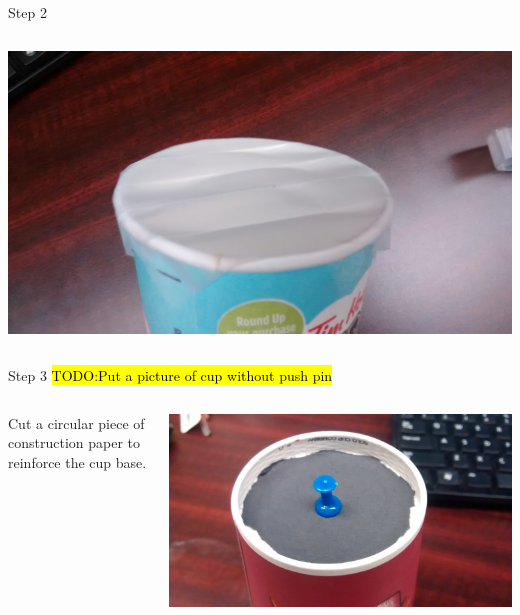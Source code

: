\begin{frame}{Step 2}
\begin{columns}
\begin{column}{0.4\textwidth}
      \includegraphics[width=\textwidth,trim=4in 0 4in 0,clip]{media/coveredlid1.jpg}
    \end{column}
  \end{columns}
\end{frame}

\begin{frame}{Step 3}
  \hl{TODO:Put a picture of cup without push pin}
  \begin{columns}
    \begin{column}{0.6\textwidth}
      Cut a circular piece of construction paper to reinforce the cup base.
    \end{column}
    \begin{column}{0.4\textwidth}
      \includegraphics[width=\textwidth]{media/pushpin.jpg}
    \end{column}
  \end{columns}
  
\end{frame}


